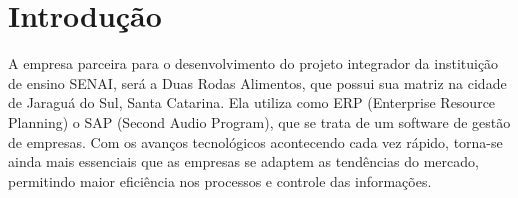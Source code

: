 
 
\chapter{Introdução}




A empresa parceira para o desenvolvimento do projeto integrador da instituição de ensino SENAI, será a Duas Rodas Alimentos, que possui sua matriz na cidade de Jaraguá do Sul, Santa Catarina. Ela utiliza como ERP (Enterprise Resource Planning) o SAP (Second Audio Program), que se trata de um software de gestão de empresas.
Com os avanços tecnológicos acontecendo cada vez rápido, torna-se ainda mais essenciais que as empresas se adaptem as tendências do mercado, permitindo maior eficiência nos processos e controle das informações.

